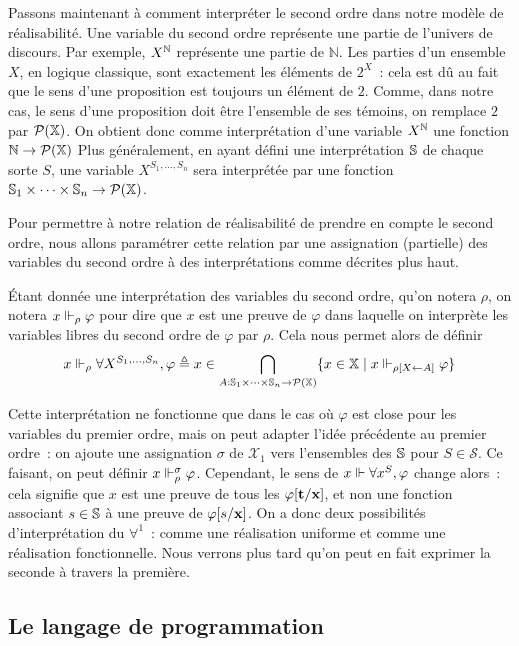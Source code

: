 \documentclass{article}
\begin{document}
Passons maintenant à comment interpréter le second ordre dans notre modèle de réalisabilité. Une variable du second ordre représente une partie de l'univers de discours. Par exemple, $X^{\mathbb{N}}$ représente une partie de $\mathbb N$. Les parties d'un ensemble $X$, en logique classique, sont exactement les éléments de $2^X$~: cela est dû au fait que le sens d'une proposition est toujours un élément de $2$. Comme, dans notre cas, le sens d'une proposition doit être l'ensemble de ses témoins, on remplace $2$ par $\mathcal P(\mathbb X)$. On obtient donc comme interprétation d'une variable $X^{\mathbb{N}}$ une fonction $\mathbb N \to \mathcal P (\mathbb X)$ Plus généralement, en ayant défini une interprétation $\mathbb{S}$ de chaque sorte $S$, une variable $X^{S_1,\ldots,S_n}$ sera interprétée par une fonction $\mathbb{S}_1\times\cdots\times\mathbb{S}_n \to \mathcal P(\mathbb X)$.

Pour permettre à notre relation de réalisabilité de prendre en compte le second ordre, nous allons paramétrer cette relation par une assignation (partielle) des variables du second ordre à des interprétations comme décrites plus haut.

\'Etant donnée une interprétation des variables du second ordre, qu'on notera $\rho$, on notera $x\Vdash_\rho \varphi$ pour dire que $x$ est une preuve de $\varphi$ dans laquelle on interprète les variables libres du second ordre de $\varphi$ par $\rho$. Cela nous permet alors de définir \[x\Vdash_\rho \forall X^{S_1,\ldots,S_n}, \varphi \triangleq x\in \bigcap_{A : \mathbb{S}_1\times\cdots\times \mathbb{S}_n \to \mathcal P(\mathbb X)} \{x \in \mathbb X\mid x\Vdash_{\rho[X\leftarrow A]} \varphi\}\]

Cette interprétation ne fonctionne que dans le cas où $\varphi$ est close pour les variables du premier ordre, mais on peut adapter l'idée précédente au premier ordre~: on ajoute une assignation $\sigma$ de $\mathcal X_1$ vers l'ensembles des $\mathbb{S}$ pour $S\in\mathcal S$. Ce faisant, on peut définir $x\Vdash_\rho^\sigma \varphi$. Cependant, le sens de $x\Vdash \forall x^S, \varphi$ change alors~: cela signifie que $x$ est une preuve de tous les $\varphi[\mathbf{t}/\mathbf{x}]$, et non une fonction associant $s\in \mathbb{S}$ à une preuve de $\varphi[s/\mathbf{x}]$. On a donc deux possibilités d'interprétation du $\forall^1$~: comme une réalisation uniforme et comme une réalisation fonctionnelle. Nous verrons plus tard qu'on peut en fait exprimer la seconde à travers la première.

\subsection{Le langage de programmation}
\end{document}

